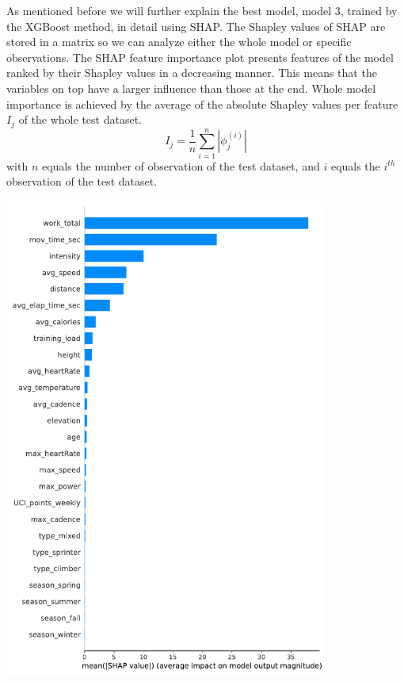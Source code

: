 \documentclass[12pt,a4paper]{article}
\let\origfigure\figure
\let\endorigfigure\endfigure
\renewenvironment{figure}[1][2] {
    \expandafter\origfigure\expandafter[H]
} {
    \endorigfigure
}
\begin{document}
As mentioned before we will further explain the best model, model 3, trained by the XGBoost method, in detail using SHAP. The Shapley values of SHAP are stored in a matrix so we can analyze either the whole model or specific observations. The SHAP feature importance plot presents features of the model ranked by their Shapley values in a decreasing manner. This means that the variables on top have a larger influence than those at the end. Whole model importance is achieved by the average of the absolute Shapley values per feature \(I_j\) of the whole test dataset.
\begin{equation}
I_{j}=\frac{1}{n} \sum_{i=1}^{n}\left|\phi_{j}^{(i)}\right|
\label{eq:feat_importance_bar}
\end{equation}
with \(n\) equals the number of observation of the test dataset, and \(i\) equals the \(i^{th}\) observation of the test dataset.

\begin{figure}
\centering
\hspace{-3cm}\includegraphics[width=0.8\textwidth]{./includes/shap/xgboost/summary_avg_p_bar.pdf}
    \caption{This figure shows the feature importance defined by the absolute mean Shapley values of each variable of model 3 fitted with the XGBoost algorithm. All values were calculated from the test dataset. For  }
    \label{fig:summary_avg_p_bar}
\end{figure}
\end{document}
